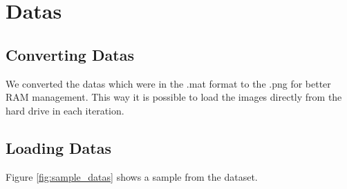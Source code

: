 \documentclass[a4paper, openany]{book}
\begin{document}
\section{Datas}
	\vspace{0.3cm}
\subsection{Converting Datas}
	\vspace{0.3cm}
We converted the datas which were in the .mat format to the .png  for better RAM management. This way it is possible to load the images directly from the hard drive in each iteration.

\subsection{Loading Datas}
Figure \ref{fig:sample_datas} shows a sample from the dataset.
\end{document}

